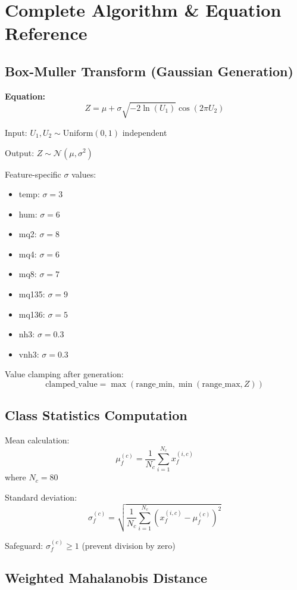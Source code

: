 \documentclass[12pt,a4paper]{article}
\begin{document}
\section{Complete Algorithm & Equation Reference}

\subsection{Box-Muller Transform (Gaussian Generation)}

\textbf{Equation:}
$$Z = \mu + \sigma \sqrt{-2 \ln(U_1)} \cos(2\pi U_2)$$

Input: $U_1, U_2 \sim \text{Uniform}(0,1)$ independent

Output: $Z \sim \mathcal{N}(\mu, \sigma^2)$

Feature-specific $\sigma$ values:
\begin{itemize}
    \item temp: $\sigma = 3$
    \item hum: $\sigma = 6$
    \item mq2: $\sigma = 8$
    \item mq4: $\sigma = 6$
    \item mq8: $\sigma = 7$
    \item mq135: $\sigma = 9$
    \item mq136: $\sigma = 5$
    \item nh3: $\sigma = 0.3$
    \item vnh3: $\sigma = 0.3$
\end{itemize}

Value clamping after generation:
$$\text{clamped\_value} = \max(\text{range\_min}, \min(\text{range\_max}, Z))$$

\subsection{Class Statistics Computation}

Mean calculation:
$$\mu_f^{(c)} = \frac{1}{N_c} \sum_{i=1}^{N_c} x_f^{(i,c)}$$
where $N_c = 80$

Standard deviation:
$$\sigma_f^{(c)} = \sqrt{\frac{1}{N_c} \sum_{i=1}^{N_c} (x_f^{(i,c)} - \mu_f^{(c)})^2}$$

Safeguard: $\sigma_f^{(c)} \geq 1$ (prevent division by zero)

\subsection{Weighted Mahalanobis Distance}
\end{document}
